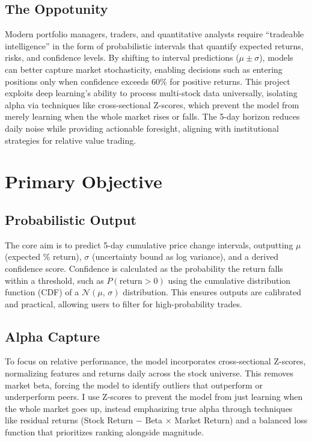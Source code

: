 \documentclass[twoside,final]{hcmut-report}
\begin{document}
\subsection{The Oppotunity}
Modern portfolio managers, traders, and quantitative analysts require ``tradeable intelligence'' in the form of probabilistic intervals that quantify expected returns, risks, and confidence levels. By shifting to interval predictions ($\mu \pm \sigma$), models can better capture market stochasticity, enabling decisions such as entering positions only when confidence exceeds 60\% for positive returns. This project exploits deep learning's ability to process multi-stock data universally, isolating alpha via techniques like cross-sectional Z-scores, which prevent the model from merely learning when the whole market rises or falls. The 5-day horizon reduces daily noise while providing actionable foresight, aligning with institutional strategies for relative value trading.

\section{Primary Objective}
\subsection{Probabilistic Output}
The core aim is to predict 5-day cumulative price change intervals, outputting $\mu$ (expected \% return), $\sigma$ (uncertainty bound as log variance), and a derived confidence score. Confidence is calculated as the probability the return falls within a threshold, such as $P(\text{return} > 0)$ using the cumulative distribution function (CDF) of a $\mathcal{N}(\mu,\,\sigma)$ distribution. This ensures outputs are calibrated and practical, allowing users to filter for high-probability trades.

\subsection{Alpha Capture}
To focus on relative performance, the model incorporates cross-sectional Z-scores, normalizing features and returns daily across the stock universe. This removes market beta, forcing the model to identify outliers that outperform or underperform peers. I use Z-scores to prevent the model from just learning when the whole market goes up, instead emphasizing true alpha through techniques like residual returns (Stock Return $-$ Beta $\times$ Market Return) and a balanced loss function that prioritizes ranking alongside magnitude.
\end{document}
